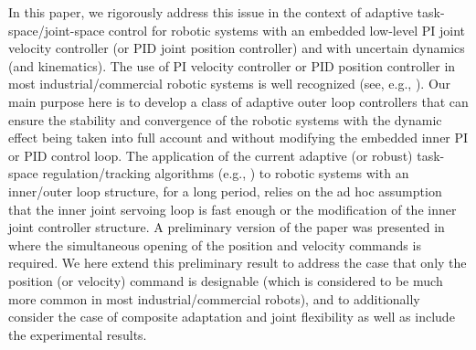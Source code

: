 \documentclass[9pt,technote]{IEEEtran}
\begin{document}
In this paper, we rigorously address this issue in the context of adaptive task-space/joint-space control for robotic systems with an embedded low-level PI joint velocity controller (or PID joint position controller) and with uncertain dynamics (and kinematics). The use of PI velocity controller or PID position controller in most industrial/commercial robotic systems is well recognized (see, e.g., \cite{Caccavale1994_CEP,Swevers2007_CSM}). {Our main purpose here is to develop a class of adaptive outer loop controllers that can ensure the stability and convergence of the robotic systems with the dynamic effect being taken into full account and without modifying the embedded inner PI or PID control loop}. The application of the current adaptive (or robust) task-space regulation/tracking algorithms (e.g., \cite{Cheah2003_TRA,Cheah2006_IJRR,Liu2006_TRO,Dixon2007_TAC,Wang2012a_MECH,Liang2014_ASJC,Wang2012_TAES,Wang2015_AUT,Wang2010_TCST,Leite2011_IFAC}) to robotic systems with an inner/outer loop structure, for a long period, relies on the ad hoc assumption that the inner joint servoing loop is fast enough or the modification of the inner joint controller structure. A preliminary version of the paper was presented in \cite{Wang2016_CCC} where the simultaneous opening of the position and velocity commands is required. We here extend this preliminary result to address the case that only the position (or velocity) command is designable (which is considered to be much more common in most industrial/commercial robots), and to additionally consider the case of composite adaptation and joint flexibility as well as include the experimental results.
\end{document}
